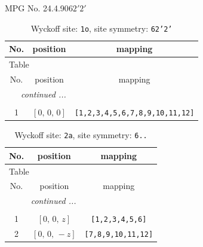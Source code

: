 \documentclass[fleqn,8pt]{jsarticle}
\begin{document}
\setcounter{MaxMatrixCols}{32}

\renewcommand{\tablename}{Table~}
\renewcommand{\figurename}{Figure~}
\begin{center}
\LARGE
MPG No. 24.4.90\quad$62'2'$
\end{center}
\renewcommand{\arraystretch}{1.2}
\begin{longtable}{ccc}
\caption{Wyckoff site: {\tt 1o}, site symmetry: {\tt 62'2'}}
 \\
 \hline \hline
No. & position & mapping \\ \hline \endfirsthead

\multicolumn{2}{l}{\tablename\ \thetable{}} \\
 \hline \hline
No. & position & mapping \\ \hline \endhead

 \hline \hline
\multicolumn{2}{r}{\footnotesize\it continued ...} \\ \endfoot

 \hline \hline
\multicolumn{2}{r}{} \\ \endlastfoot

1 & $\left[ 0,\, 0,\, 0 \right]$ & {\tt [1,2,3,4,5,6,7,8,9,10,11,12]} \\
\end{longtable}
\renewcommand{\arraystretch}{1.2}
\begin{longtable}{ccc}
\caption{Wyckoff site: {\tt 2a}, site symmetry: {\tt 6..}}
 \\
 \hline \hline
No. & position & mapping \\ \hline \endfirsthead

\multicolumn{2}{l}{\tablename\ \thetable{}} \\
 \hline \hline
No. & position & mapping \\ \hline \endhead

 \hline \hline
\multicolumn{2}{r}{\footnotesize\it continued ...} \\ \endfoot

 \hline \hline
\multicolumn{2}{r}{} \\ \endlastfoot

1 & $\left[ 0,\, 0,\, z \right]$ & {\tt [1,2,3,4,5,6]} \\ \hline
2 & $\left[ 0,\, 0,\, - z \right]$ & {\tt [7,8,9,10,11,12]} \\
\end{longtable}
\renewcommand{\arraystretch}{1.2}
\end{document}
